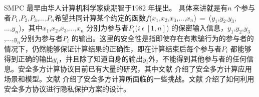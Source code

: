 SMPC 最早由华人计算机科学家姚期智于1982 年提出\cite{yao1982protocols}。 具体来讲就是有$n$ 个参与者$P_1$,$P_2$,$P_3$,...,$P_n$希望共同计算某个约定的函数$f$($x_1$,$x_2$,$x_3$,...,$x_n$)~=~($y_1$,$y_2$,$y_3$,\\ ...,$y_n$)，其中$x_1$,$x_2$,$x_3$,...,$x_n$ 分别为参与者$P_i$($i ~\epsilon ~[1,n]$) 的保密输入信息，$y_1$,$y_2$,$y_3$,...,$y_n$分别为参与者$P_i$ 的输出。这里的安全性是指即使存在有欺骗行为的参与者的情况下，仍然能够保证计算结果的正确性，即在计算结束后每个参与者$P_i$ 都能够得到正确的输出$y_i$，并且除了知道自身的输出$y_i$外，不能得到其他参与者的任何信息。安全多方计算协议目前已有大量的研究\cite{clifton2002tools}\cite{goldwasser1997multi}\cite{du2001secure}\cite{oleshchuk2007secure}，其中文献\cite{goldwasser1997multi} 介绍了安全多方计算应用场景和模型。文献\cite{goldwasser1997multi}\cite{oleshchuk2007secure} 介绍了安全多方计算所面临的一些挑战。文献\cite{shi2011privacy}\cite{jung2013privacy} 介绍了如何利用安全多方协议进行隐私保护方案的设计。

